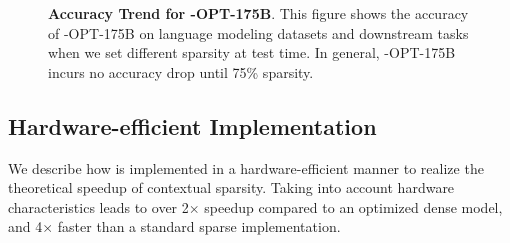 \begin{figure}[t]
  \centering
  \vspace{-2mm}
  \vspace{-3mm}
  \caption{\textbf{ Accuracy Trend for \name{}-OPT-175B}. This figure shows the accuracy of \name{}-OPT-175B on language modeling datasets and downstream tasks when we set different sparsity at test time. In general, \name{}-OPT-175B incurs no accuracy drop until 75\% sparsity.\vspace{-1em}}
   \label{exp:kshot} 
\end{figure}

\subsection{Hardware-efficient Implementation}
\label{sec:sparse_matmul}

We describe how \name{} is implemented in a hardware-efficient manner to realize the
theoretical speedup of contextual sparsity.
Taking into account hardware characteristics leads to over 2$\times$ speedup
compared to an optimized dense model, and 4$\times$ faster than a standard sparse
implementation.

